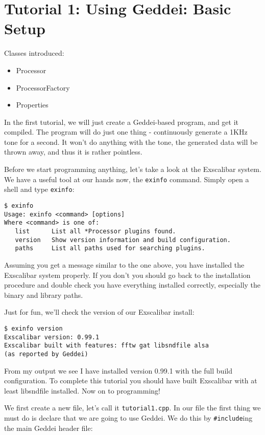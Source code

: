 \section{Tutorial 1: Using Geddei: Basic Setup}

Classes introduced:
\begin{itemize}
\item Processor
\item ProcessorFactory
\item Properties
\end{itemize}

In the first tutorial, we will just create a Geddei-based program, and get it compiled. The program will do just one thing - continuously generate a 1KHz tone for a second. It won't do anything with the tone, the generated data will be thrown away, and thus it is rather pointless.

Before we start programming anything, let's take a look at the Exscalibar system. We have a useful tool at our hands now, the \texttt{exinfo} command. Simply open a shell and type \texttt{exinfo}:

\begin{verbatim}
$ exinfo
Usage: exinfo <command> [options]
Where <command> is one of:
   list      List all *Processor plugins found.
   version   Show version information and build configuration.
   paths     List all paths used for searching plugins.
\end{verbatim}

Assuming you get a message similar to the one above, you have installed the Exscalibar system properly. If you don't you should go back to the installation procedure and double check you have everything installed correctly, especially the binary and library paths.

Just for fun, we'll check the version of our Exscalibar install:

\begin{verbatim}
$ exinfo version
Exscalibar version: 0.99.1
Exscalibar built with features: fftw gat libsndfile alsa
(as reported by Geddei)
\end{verbatim}

From my output we see I have installed version 0.99.1 with the full build configuration. To complete this tutorial you should have built Exscalibar with at least libsndfile installed. Now on to programming!

We first create a new file, let's call it \texttt{tutorial1.cpp}. In our file the first thing we must do is declare that we are going to use Geddei. We do this by \texttt{\#include}ing the main Geddei header file:

